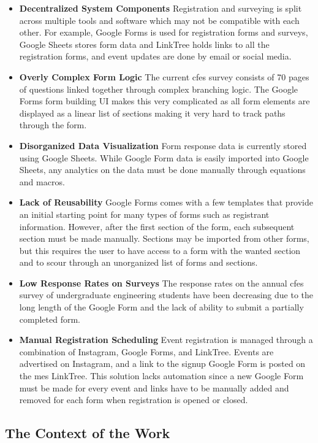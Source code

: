 \documentclass[12pt]{article}
\begin{document}
\begin{itemize}
  \item \textbf{Decentralized System Components} Registration and surveying is split across multiple tools and
    software which may not be compatible with each other. For example, Google Forms is used for registration forms and
    surveys, Google Sheets stores form data and LinkTree holds links to all the registration forms, and event updates are
    done by email or social media.
  \item \textbf{Overly Complex Form Logic} The current \gls{cfes} survey consists of 70 pages of questions linked
    together through complex branching logic. The Google Forms form building UI makes this very complicated as all form
    elements are displayed as a linear list of sections making it very hard to track paths through the form.
  \item \textbf{Disorganized Data Visualization} Form response data is currently stored using Google Sheets. While
    Google Form data is easily imported into Google Sheets, any analytics on the data must be done manually through
    equations and macros.
  \item \textbf{Lack of Reusability} Google Forms comes with a few templates that provide an initial starting point for
    many types of forms such as registrant information. However, after the first section of the form, each subsequent
    section must be made manually. Sections may be imported from other forms, but this requires the user to have access
    to a form with the wanted section and to scour through an unorganized list of forms and sections.
  \item \textbf{Low Response Rates on Surveys} The response rates on the annual \gls{cfes} survey of undergraduate engineering
    students have been decreasing due to the long length of the Google Form and the lack of ability to submit a
    partially completed form.
  \item \textbf{Manual Registration Scheduling} Event registration is managed through a combination of Instagram, Google
    Forms, and LinkTree. Events are advertised on Instagram, and a link to the signup Google Form is posted on the
    \gls{mes} LinkTree. This solution lacks automation since a new Google Form must be made for every event and links
    have to be manually added and removed for each form when registration is opened or closed.
\end{itemize}

\subsection{The Context of the Work}
\end{document}
